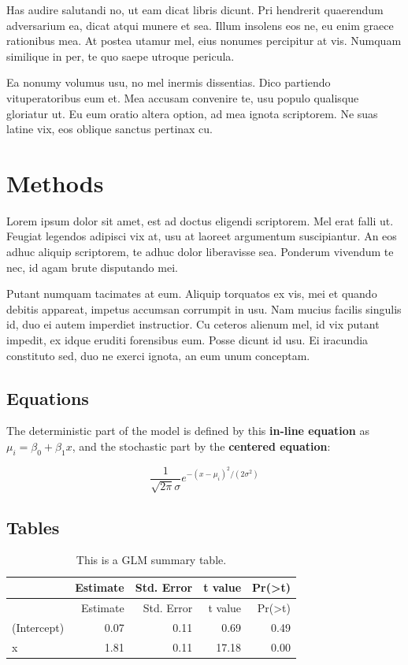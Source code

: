 \documentclass[]{article}
\begin{document}
Has audire salutandi no, ut eam dicat libris dicunt. Pri hendrerit
quaerendum adversarium ea, dicat atqui munere et sea. Illum insolens eos
ne, eu enim graece rationibus mea. At postea utamur mel, eius nonumes
percipitur at vis. Numquam similique in per, te quo saepe utroque
pericula.

Ea nonumy volumus usu, no mel inermis dissentias. Dico partiendo
vituperatoribus eum et. Mea accusam convenire te, usu populo qualisque
gloriatur ut. Eu eum oratio altera option, ad mea ignota scriptorem. Ne
suas latine vix, eos oblique sanctus pertinax cu.

\section{Methods}\label{methods}

Lorem ipsum dolor sit amet, est ad doctus eligendi scriptorem. Mel erat
falli ut. Feugiat legendos adipisci vix at, usu at laoreet argumentum
suscipiantur. An eos adhuc aliquip scriptorem, te adhuc dolor
liberavisse sea. Ponderum vivendum te nec, id agam brute disputando mei.

Putant numquam tacimates at eum. Aliquip torquatos ex vis, mei et quando
debitis appareat, impetus accumsan corrumpit in usu. Nam mucius facilis
singulis id, duo ei autem imperdiet instructior. Cu ceteros alienum mel,
id vix putant impedit, ex idque eruditi forensibus eum. Posse dicunt id
usu. Ei iracundia constituto sed, duo ne exerci ignota, an eum unum
conceptam.

\subsection{Equations}\label{equations}

The deterministic part of the model is defined by this \textbf{in-line
equation} as \(\mu_i = \beta_0 + \beta_1x\), and the stochastic part by
the \textbf{centered equation}:

\[ \frac{1}{\sqrt{2\pi}\sigma}e^{-(x-\mu_i)^2/(2\sigma^2)} \]

\subsection{Tables}\label{tables}

\begin{longtable}[c]{@{}lrrrr@{}}
\caption{This is a GLM summary table.}\tabularnewline
\toprule
& Estimate & Std. Error & t value &
Pr(\textgreater{}\textbar{}t\textbar{})\tabularnewline
\midrule
\endfirsthead
\toprule
& Estimate & Std. Error & t value &
Pr(\textgreater{}\textbar{}t\textbar{})\tabularnewline
\midrule
\endhead
(Intercept) & 0.07 & 0.11 & 0.69 & 0.49\tabularnewline
x & 1.81 & 0.11 & 17.18 & 0.00\tabularnewline
\bottomrule
\end{longtable}
\end{document}
